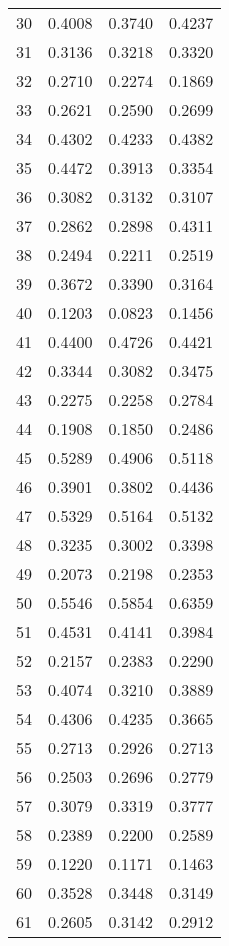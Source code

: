 \begin{table}[ht]
\begin{tabular}{|c|c|c|c|}
30  &  0.4008   &  0.3740   &  0.4237 \\ 
31  &  0.3136   &  0.3218   &  0.3320 \\ 
32  &  0.2710   &  0.2274   &  0.1869 \\ 
33  &  0.2621   &  0.2590   &  0.2699 \\ 
34  &  0.4302   &  0.4233   &  0.4382 \\ 
35  &  0.4472   &  0.3913   &  0.3354 \\ 
36  &  0.3082   &  0.3132   &  0.3107 \\ 
37  &  0.2862   &  0.2898   &  0.4311 \\ 
38  &  0.2494   &  0.2211   &  0.2519 \\ 
39  &  0.3672   &  0.3390   &  0.3164 \\ 
40  &  0.1203   &  0.0823   &  0.1456 \\ 
41  &  0.4400   &  0.4726   &  0.4421 \\ 
42  &  0.3344   &  0.3082   &  0.3475 \\ 
43  &  0.2275   &  0.2258   &  0.2784 \\ 
44  &  0.1908   &  0.1850   &  0.2486 \\ 
45  &  0.5289   &  0.4906   &  0.5118 \\ 
46  &  0.3901   &  0.3802   &  0.4436 \\ 
47  &  0.5329   &  0.5164   &  0.5132 \\ 
48  &  0.3235   &  0.3002   &  0.3398 \\ 
49  &  0.2073   &  0.2198   &  0.2353 \\ 
50  &  0.5546   &  0.5854   &  0.6359 \\ 
51  &  0.4531   &  0.4141   &  0.3984 \\ 
52  &  0.2157   &  0.2383   &  0.2290 \\ 
53  &  0.4074   &  0.3210   &  0.3889 \\ 
54  &  0.4306   &  0.4235   &  0.3665 \\ 
55  &  0.2713   &  0.2926   &  0.2713 \\ 
56  &  0.2503   &  0.2696   &  0.2779 \\ 
57  &  0.3079   &  0.3319   &  0.3777 \\ 
58  &  0.2389   &  0.2200   &  0.2589 \\ 
59  &  0.1220   &  0.1171   &  0.1463 \\ 
60  &  0.3528   &  0.3448   &  0.3149 \\ 
61  &  0.2605   &  0.3142   &  0.2912 \\ 

\end{tabular}
\end{table}
